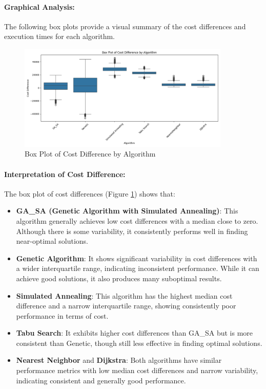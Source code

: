 \documentclass[
]{article}
\begin{document}
    \paragraph{Graphical Analysis:}
    The following box plots provide a visual summary of the cost differences and execution times for each algorithm.

    \begin{figure}[h!]
        \centering
        \includegraphics[width=0.9\textwidth]{algo_summary/boxplot_cost_difference}
        \caption{Box Plot of Cost Difference by Algorithm}
        \label{fig:boxplot_cost_difference}
    \end{figure}

    \paragraph{Interpretation of Cost Difference:}
    The box plot of cost differences (Figure \ref{fig:boxplot_cost_difference}) shows that:
    \begin{itemize}
        \item \textbf{GA\_SA (Genetic Algorithm with Simulated Annealing)}: This algorithm generally achieves low cost differences with a median close to zero. Although there is some variability, it consistently performs well in finding near-optimal solutions.
        \item \textbf{Genetic Algorithm}: It shows significant variability in cost differences with a wider interquartile range, indicating inconsistent performance. While it can achieve good solutions, it also produces many suboptimal results.
        \item \textbf{Simulated Annealing}: This algorithm has the highest median cost difference and a narrow interquartile range, showing consistently poor performance in terms of cost.
        \item \textbf{Tabu Search}: It exhibits higher cost differences than GA\_SA but is more consistent than Genetic, though still less effective in finding optimal solutions.
        \item \textbf{Nearest Neighbor} and \textbf{Dijkstra}: Both algorithms have similar performance metrics with low median cost differences and narrow variability, indicating consistent and generally good performance.
    \end{itemize}
\end{document}
